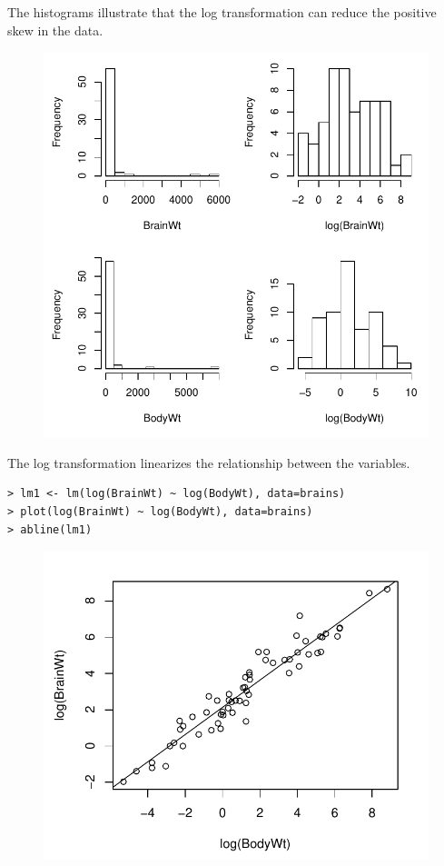 \documentclass[10pt]{beamer}
\begin{document}
\begin{frame}
The histograms illustrate that the log transformation can reduce the positive skew in the data.
\begin{figure}
\includegraphics[scale=0.5]{figure/brain_hist.pdf}
\end{figure}
\end{frame}

\begin{frame}[fragile]
The log transformation linearizes the relationship between the variables.
\small
\begin{verbatim}
> lm1 <- lm(log(BrainWt) ~ log(BodyWt), data=brains)
> plot(log(BrainWt) ~ log(BodyWt), data=brains)
> abline(lm1)
\end{verbatim}
\begin{figure}
\includegraphics[scale=0.5]{figure/logbrain_scat.pdf}
\end{figure}
\end{frame}
\end{document}
